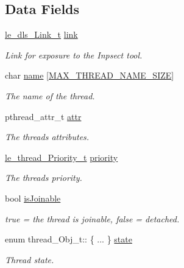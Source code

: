 \subsection*{Data Fields}
\begin{DoxyCompactItemize}
\item 
\hyperlink{structle__dls___link__t}{le\+\_\+dls\+\_\+\+Link\+\_\+t} \hyperlink{structthread___obj__t_a713b7ec59e7c1c0d8a933ce49ea43632}{link}
\begin{DoxyCompactList}\small\item\em Link for exposure to the Inpsect tool. \end{DoxyCompactList}\item 
char \hyperlink{structthread___obj__t_a78946fc2ad93a3731b0be441f5d8dc94}{name} \mbox{[}\hyperlink{thread_8h_ad14524ab7c2b14d0c553fb37eafcbdf0}{M\+A\+X\+\_\+\+T\+H\+R\+E\+A\+D\+\_\+\+N\+A\+M\+E\+\_\+\+S\+I\+ZE}\mbox{]}
\begin{DoxyCompactList}\small\item\em The name of the thread. \end{DoxyCompactList}\item 
pthread\+\_\+attr\+\_\+t \hyperlink{structthread___obj__t_acd96155ef5b50606df67487c09bb8027}{attr}
\begin{DoxyCompactList}\small\item\em The thread\textquotesingle{}s attributes. \end{DoxyCompactList}\item 
\hyperlink{le__thread_8h_a653b0f17cd4d4567c86a25e23d004f07}{le\+\_\+thread\+\_\+\+Priority\+\_\+t} \hyperlink{structthread___obj__t_ae4b49f8e4c11f31f01d214017b3d3f71}{priority}
\begin{DoxyCompactList}\small\item\em The thread\textquotesingle{}s priority. \end{DoxyCompactList}\item 
bool \hyperlink{structthread___obj__t_ae66955c806e53ee92fbba7f8f58186e7}{is\+Joinable}
\begin{DoxyCompactList}\small\item\em true = the thread is joinable, false = detached. \end{DoxyCompactList}\item 
enum thread\+\_\+\+Obj\+\_\+t\+:: \{ ... \}  \hyperlink{structthread___obj__t_a425d109a4c74ba9fd610c8e4050200db}{state}
\begin{DoxyCompactList}\small\item\em Thread state. \end{DoxyCompactList}\item 

\end{DoxyCompactItemize}
